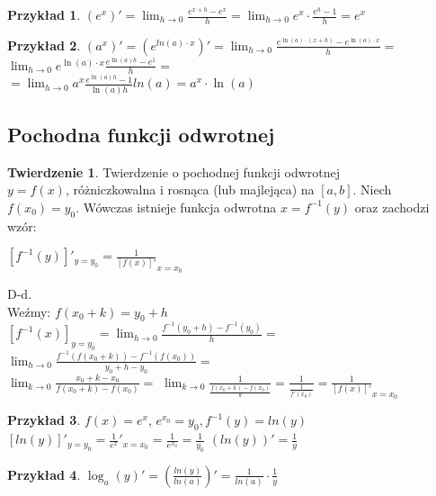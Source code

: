 \documentclass{article}
\theoremstyle{definition}
\theoremstyle{definition}
\newtheorem{tw}{Twierdzenie}[subsection]
\theoremstyle{definition}
\newtheorem{pk}{Przykład}[subsection]
\theoremstyle{definition}
\begin{document}
\begin{pk}
    $(e^x)'=\lim_{h\rightarrow 0} \frac{e^{x+h}-e^x}{h} = \lim_{h\rightarrow 0} e^x\cdot \frac{e^h-1}{h} = e^x$   
\end{pk}

\begin{pk}
    $(a^x)'=(e^{ln(a)\cdot x})'=\lim_{h\rightarrow 0} \frac{e^{\ln(a)\cdot(x+h)}-e^{\ln(a)\cdot x}}{h}=$
    $\lim_{h\rightarrow 0} e^{\ln(a)\cdot x} \frac{e^{\ln(a) h}- e^{1}}{h}=$\\
    $=\lim_{h\rightarrow 0} a^x \frac{e^{\ln(a)h}-1}{\ln(a) h} ln(a) = a^x \cdot \ln(a)$
\end{pk}

\subsection{Pochodna funkcji odwrotnej}

\begin{tw}
    Twierdzenie o pochodnej funkcji odwrotnej\\
    $y=f(x)$, różniczkowalna i rosnąca (lub majlejąca) na $[a,b]$.
    Niech $f(x_0)=y_0$. Wówczas istnieje funkcja odwrotna $x=f^{-1}(y)$
    oraz zachodzi wzór:
    \begin{center}
        $\left[f^{-1}(y)\right]'_{y=y_0} = \frac{1}{\left[f(x)\right]'}_{x=x_0}$
    \end{center}
\end{tw}
D-d.\\
Weźmy: $f(x_0 + k) = y_0 + h$\\
$\left[f^{-1}(x)\right]_{y=y_0}=\lim_{h\rightarrow 0} \frac{f^{-1}(y_0+h) - f^{-1}(y_0)}{h}=$
$\lim_{h\rightarrow 0} \frac{f^{-1}(f(x_0+k))-f^{-1}(f(x_0))}{y_0+h-y_0}=$\\
$\lim_{k\rightarrow 0} \frac{x_0 + k - x_0}{f(x_0 +k)-f(x_0)}=$
$\lim_{k\rightarrow 0} \frac{1}{\frac{f(x_0+k)-f(x_0)}{k}}=\frac{1}{\frac{1}{f'(x_0)}}=\frac{1}{\left[f(x)\right]'}_{x=x_0}$

\begin{pk}
    $f(x)=e^x$, $e^{x_0}=y_0, f^{-1}(y)=ln(y)$\\
    $\left[ln(y)\right]'_{y=y_0}=\frac{1}{e^x}'_{x=x_0} = \frac{1}{e^{x_0}} = \frac{1}{y_0}$
    $\left(ln(y)\right)' = \frac{1}{y}$
\end{pk}

\begin{pk}
    $\log_a(y)'=\left(\frac{ln(y)}{ln(a)}\right)'=\frac{1}{ln(a)} \cdot \frac{1}{y}$
\end{pk}
\end{document}
